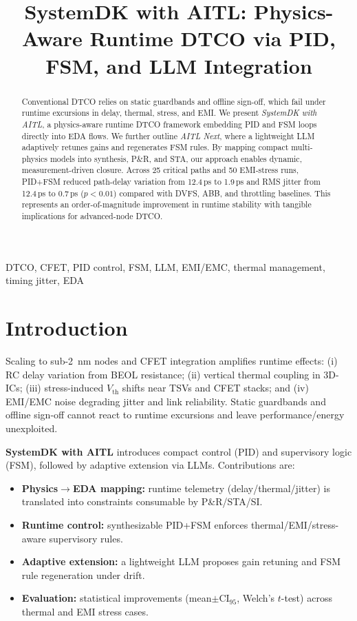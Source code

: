 \documentclass[conference]{IEEEtran}
\title{SystemDK with AITL: Physics-Aware Runtime DTCO via PID, FSM, and LLM Integration}
\author{\IEEEauthorblockN{Shinichi Samizo}
\IEEEauthorblockA{Independent Semiconductor Researcher\\
Email: \href{mailto:shin3t72@gmail.com}{shin3t72@gmail.com}}}
\newcommand{\CI}{\mathrm{CI}_{95}}
\begin{document}
\maketitle

\begin{abstract}
Conventional DTCO relies on static guardbands and offline sign-off, which fail under runtime excursions in delay, thermal, stress, and EMI. We present \emph{SystemDK with AITL}, a physics-aware runtime DTCO framework embedding PID and FSM loops directly into EDA flows. We further outline \emph{AITL Next}, where a lightweight LLM adaptively retunes gains and regenerates FSM rules. By mapping compact multi-physics models into synthesis, P\&R, and STA, our approach enables dynamic, measurement-driven closure. Across 25 critical paths and 50 EMI-stress runs, PID+FSM reduced path-delay variation from 12.4\,ps to 1.9\,ps and RMS jitter from 12.4\,ps to 0.7\,ps ($p<0.01$) compared with DVFS, ABB, and throttling baselines. This represents an order-of-magnitude improvement in runtime stability with tangible implications for advanced-node DTCO.
\end{abstract}

\begin{IEEEkeywords}
DTCO, CFET, PID control, FSM, LLM, EMI/EMC, thermal management, timing jitter, EDA
\end{IEEEkeywords}

\section{Introduction}
Scaling to sub-\SI{2}{\nano\meter} nodes and CFET integration amplifies runtime effects: (i) RC delay variation from BEOL resistance; (ii) vertical thermal coupling in 3D-ICs; (iii) stress-induced $V_\mathrm{th}$ shifts near TSVs and CFET stacks; and (iv) EMI/EMC noise degrading jitter and link reliability. Static guardbands and offline sign-off cannot react to runtime excursions and leave performance/energy unexploited.

\textbf{SystemDK with AITL} introduces compact control (PID) and supervisory logic (FSM), followed by adaptive extension via LLMs. Contributions are:
\begin{itemize}
  \item \textbf{Physics$\rightarrow$EDA mapping:} runtime telemetry (delay/thermal/jitter) is translated into constraints consumable by P\&R/STA/SI.
  \item \textbf{Runtime control:} synthesizable PID+FSM enforces thermal/EMI/stress-aware supervisory rules.
  \item \textbf{Adaptive extension:} a lightweight LLM proposes gain retuning and FSM rule regeneration under drift.
  \item \textbf{Evaluation:} statistical improvements (mean$\pm\CI$, Welch’s $t$-test) across thermal and EMI stress cases.
\end{itemize}
\end{document}
